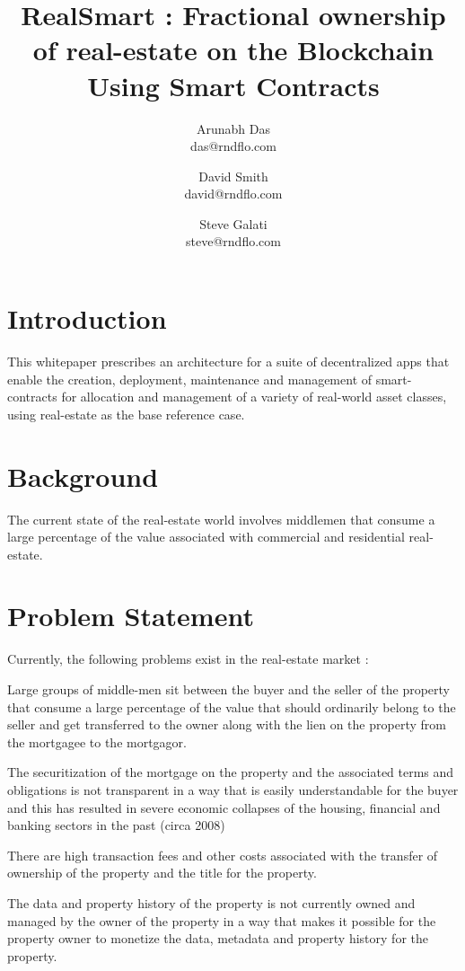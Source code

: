 \documentclass{article}
\author{Arunabh Das \\ {das@rndflo.com}
   \and David Smith \\ {david@rndflo.com} 
   \and Steve Galati \\ {steve@rndflo.com} }
\title{RealSmart : Fractional ownership of real-estate on the Blockchain Using Smart Contracts}
\date{\vspace{-5ex}}
\begin{document}
\maketitle

\section{Introduction}


This whitepaper prescribes an architecture for a suite of decentralized apps that enable the creation, 
deployment, maintenance and management of smart-contracts for allocation and management of a variety 
of real-world asset classes, using real-estate as the base reference case.




\section{Background}


The current state of the real-estate world involves middlemen that consume a large percentage of the 
value associated with commercial and residential real-estate.

\section{Problem Statement}


Currently, the following problems exist in the real-estate market :

Large groups of middle-men sit between the buyer and the seller of the property that consume a large 
percentage of the value that should ordinarily belong to the seller and get transferred to the owner 
along with the lien on the property from the mortgagee to the mortgagor.


The securitization of the mortgage on the property and the associated terms and obligations is not 
transparent in a way that is easily understandable for the buyer and this has resulted in severe 
economic collapses of the housing, financial and banking sectors in the past (circa 2008)


There are high transaction fees and other costs associated with the transfer of ownership of the property 
and the title for the property.


The data and property history of the property is not currently owned and managed by the owner of the 
property in a way that makes it possible for the property owner to monetize the data, metadata and property history for the property.
\end{document}
